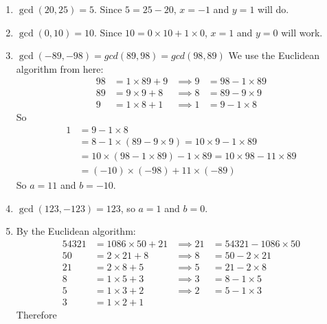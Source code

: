 \documentclass{article}
\theoremstyle{definition}
\begin{document}
\begin{solution}
    \begin{enumerate}
        \item $\gcd(20,25) = 5$.  Since $5 = 25-20$, $x=-1$ and $y=1$ will do.
        \item $\gcd(0,10) = 10$.  Since $10 = 0 \times 10 + 1 \times 0$, $x=1$ and $y=0$ will work.
        \item $\gcd(-89,-98) = gcd(89,98) = gcd(98,89)$
            We use the Euclidean algorithm from here:
            \begin{align*}
                98 &= 1 \times 89 + 9 &\implies 9 &= 98 - 1 \times 89 \\
                89 &= 9 \times 9 + 8  &\implies 8 &= 89 - 9 \times 9 \\
                 9 &= 1 \times 8 + 1  &\implies 1 &= 9 - 1 \times 8
            \end{align*}
            So
            \begin{align*}
                1 &= 9 - 1 \times 8 \\
                  &= 8 - 1 \times (89 - 9 \times 9)
                   = 10 \times 9 - 1 \times 89 \\
                  &= 10 \times (98 - 1 \times 89) - 1 \times 89
                   = 10 \times 98 - 11 \times 89 \\
                  &= (-10) \times (-98) + 11 \times (-89)
            \end{align*}
            So $a=11$ and $b=-10$.
        \item $\gcd(123,-123) =123$, so $a=1$ and $b=0$.
        \item By the Euclidean algorithm:
            \begin{align*}
                54321 &= 1086 \times 50 + 21 &\implies 21 &= 54321 - 1086 \times 50 \\
                   50 &= 2 \times 21 + 8     &\implies 8  &= 50 - 2 \times 21 \\
                   21 &= 2 \times 8 + 5      &\implies 5  &= 21 - 2 \times 8 \\
                    8 &= 1 \times 5 + 3      &\implies 3  &=  8 - 1 \times 5 \\
                    5 &= 1 \times 3 + 2      &\implies 2  &=  5 - 1 \times 3 \\
                    3 &= 1 \times 2 + 1
            \end{align*}
            Therefore
            \begin{align*}

\end{align*}
\end{enumerate}
\end{solution}
\end{document}
